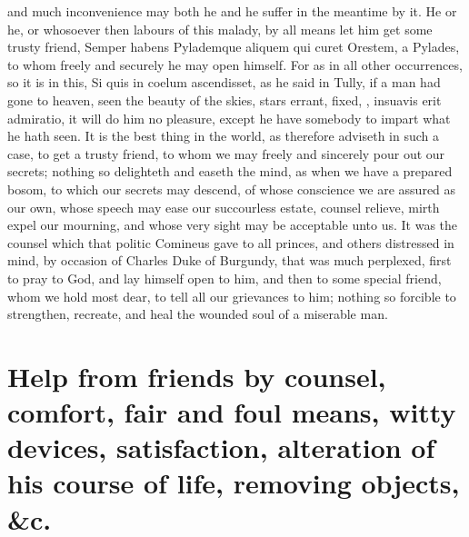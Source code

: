 {and much inconvenience may both he and he suffer in the meantime by it.
He or he, or whosoever then labours of this malady, by all means let
him get some trusty friend, Semper habens Pylademque aliquem qui
curet Orestem, a Pylades, to whom freely and securely he may open
himself. For as in all other occurrences, so it is in this, Si quis in
coelum ascendisset, \etc{} as he said in Tully, if a man had gone to
heaven, seen the beauty of the skies, stars errant, fixed, \etc{},
insuavis erit admiratio, it will do him no pleasure, except he have
somebody to impart what he hath seen. It is the best thing in the
world, as \Seneca therefore adviseth in such a case, to get a
trusty friend, to whom we may freely and sincerely pour out our
secrets; nothing so delighteth and easeth the mind, as when we have a
prepared bosom, to which our secrets may descend, of whose conscience
we are assured as our own, whose speech may ease our succourless
estate, counsel relieve, mirth expel our mourning, and whose very sight
may be acceptable unto us. It was the counsel which that politic
Comineus gave to all princes, and others distressed in mind, by
occasion of Charles Duke of Burgundy, that was much perplexed, first to
pray to God, and lay himself open to him, and then to some special
friend, whom we hold most dear, to tell all our grievances to him;
nothing so forcible to strengthen, recreate, and heal the wounded soul
of a miserable man.

\section[Help from friends by counsel]{Help from friends by counsel, comfort, fair and foul means, witty devices, satisfaction, alteration of his course of life, removing objects, \&c.}

}
